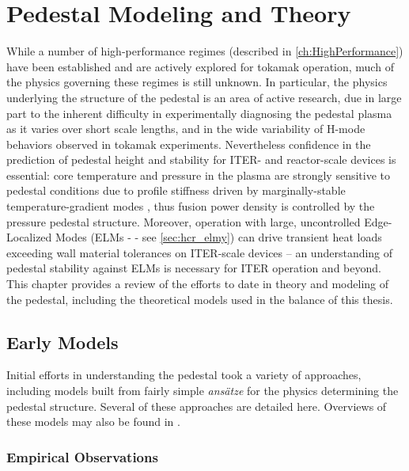 \chapter{Pedestal Modeling and Theory}\label{ch:Modeling}

While a number of high-performance regimes (described in \cref{ch:HighPerformance}) have been established and are actively explored for tokamak operation, much of the physics governing these regimes is still unknown.  In particular, the physics underlying the structure of the pedestal is an area of active research, due in large part to the inherent difficulty in experimentally diagnosing the pedestal plasma as it varies over short scale lengths, and in the wide variability of H-mode behaviors observed in tokamak experiments.  Nevertheless confidence in the prediction of pedestal height and stability for ITER- and reactor-scale devices is essential: core temperature and pressure in the plasma are strongly sensitive to pedestal conditions due to profile stiffness driven by marginally-stable temperature-gradient modes \cite{Hubbard1998}, thus fusion power density is controlled by the pressure pedestal structure.  Moreover, operation with large, uncontrolled Edge-Localized Modes (ELMs -
- see \cref{sec:hcr_elmy}) can drive transient heat loads exceeding wall material tolerances on ITER-scale devices \cite{Loarte2003,Federici2003} -- an understanding of pedestal stability against ELMs is necessary for ITER operation and beyond.  This chapter provides a review of the efforts to date in theory and modeling of the pedestal, including the theoretical models used in the balance of this thesis.\nicesectionending{}

\section{Early Models}\label{sec:mod_early}

Initial efforts in understanding the pedestal took a variety of approaches, including models built from fairly simple \emph{ans\"{a}tze} for the physics determining the pedestal structure.  Several of these approaches are detailed here.  Overviews of these models may also be found in \cite[\S 2]{Hubbard2000,Hughes2005}.

\subsection{Empirical Observations}\label{subsec:mod_empirical}

